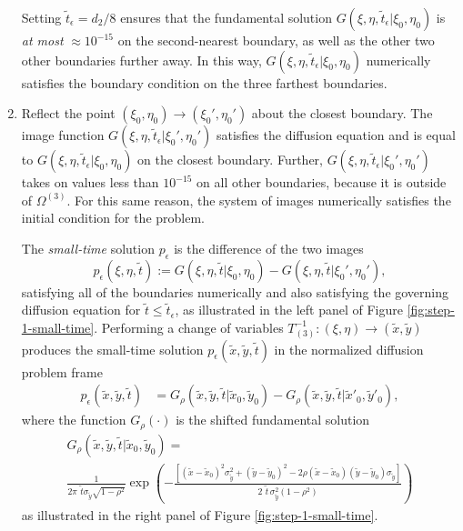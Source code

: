 \begin{enumerate}
  Setting $\tilde{t}_\epsilon = d_2/8$ ensures that the fundamental
  solution $G(\xi,\eta,\tilde{t}_\epsilon | \xi_0, \eta_0)$ is
  \textit{at most} $\approx 10^{-15}$ on the second-nearest boundary,
  as well as the other two other boundaries further away. In this way,
  $G(\xi,\eta,\tilde{t}_\epsilon | \xi_0, \eta_0)$ numerically satisfies the
  boundary condition on the three farthest boundaries.

\item Reflect the point $(\xi_0, \eta_0) \to (\xi_0', \eta_0')$ about
  the closest boundary. The image function
  $G(\xi,\eta,\tilde{t}_\epsilon | \xi_0', \eta_0')$ satisfies the
  diffusion equation and is equal to
  $G(\xi,\eta,\tilde{t}_\epsilon | \xi_0, \eta_0)$ on the closest
  boundary. Further,
  $G(\xi,\eta,\tilde{t}_\epsilon | \xi_0', \eta_0')$ takes on values
  less than $10^{-15}$ on all other boundaries, because it is outside
  of $\Omega^{(3)}$. For this same reason, the system of images numerically
  satisfies the initial condition for the problem.

  The \textit{small-time} solution $p_\epsilon$ is the difference of the two images
  \[
    p_\epsilon(\xi,\eta,\tilde{t}) := G(\xi,\eta,\tilde{t} | \xi_0,
    \eta_0) - G(\xi,\eta,\tilde{t} | \xi_0', \eta_0'),
  \]
  satisfying all of the boundaries numerically and also satisfying the
  governing diffusion equation for
  $\tilde{t} \leq \tilde{t}_\epsilon$, as illustrated in the left
  panel of Figure \ref{fig:step-1-small-time}. Performing a change of
  variables $T_{(3)}^{-1}: (\xi,\eta) \to (\tilde{x}, \tilde{y})$
  produces the small-time solution
  $p_\epsilon(\tilde{x},\tilde{y},\tilde{t})$ in the normalized
  diffusion problem frame
  \begin{align}
    p_\epsilon(\tilde{x}, \tilde{y}, \tilde{t}) &= G_\rho(\tilde{x}, \tilde{y}, \tilde{t} | \tilde{x}_0, \tilde{y}_0) - G_\rho(\tilde{x}, \tilde{y}, \tilde{t} | \tilde{x}'_0, \tilde{y}'_0), \label{eq:p-epsilon}
  \end{align}
  where the function $G_\rho(\cdot)$ is the shifted fundamental solution
  \begin{multline}
    G_\rho(\tilde{x}, \tilde{y}, \tilde{t} | \tilde{x}_0, \tilde{y}_0) = \nonumber \\
    \frac{1}{2\pi\,\, \tilde{t}\sigma_{\tilde{y}}\sqrt{1-\rho^2}} \exp\left( -\frac{\left[ \left(\tilde{x}-\tilde{x}_0\right)^2 \sigma_{\tilde{y}}^2 + \left(\tilde{y}-\tilde{y}_0\right)^2 - 2\rho(\tilde{x}-\tilde{x}_0)(\tilde{y}-\tilde{y}_0)\sigma_{\tilde{y}} \right]}{2\,\,\tilde{t}\, \sigma_{\tilde{y}}^2 (1-\rho^2)} \right) \label{eq:Gfundamental}
    \end{multline}
    as illustrated in the right panel of Figure
    \ref{fig:step-1-small-time}.
\end{enumerate}

